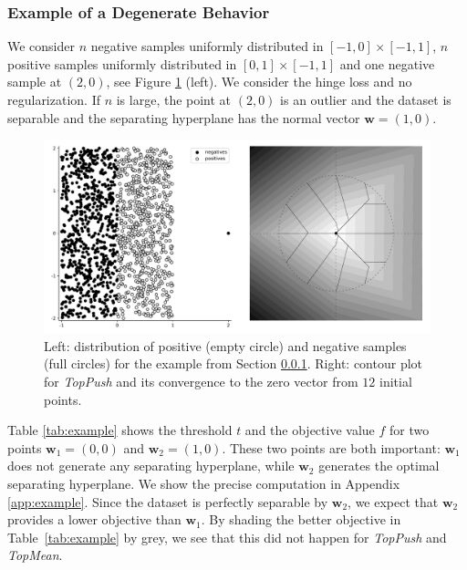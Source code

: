 \documentclass[]{interact}
\theoremstyle{plain}%
\theoremstyle{definition}
\theoremstyle{remark}
\newcommand{\toppush}{\emph{TopPush}\xspace}
\newcommand{\topmeank}{\emph{TopMean}\xspace}
\begin{document}
\subsubsection{Example of a Degenerate Behavior}\label{sec:example}

We consider $n$ negative samples uniformly distributed in $[-1,0]\times[-1,1]$, $n$ positive samples uniformly distributed in $[0,1]\times[-1,1]$ and one negative sample at $(2,0)$, see Figure \ref{fig:example} (left). We consider the hinge loss and no regularization. If $n$ is large, the point at $(2,0)$ is an outlier and the dataset is separable and the separating hyperplane has the normal vector $\bm w=(1,0)$. 

\begin{figure}[!ht]
\centering
\includegraphics[width=0.7\linewidth]{figures/toppush_convergence.pdf}
\caption{Left: distribution of positive (empty circle) and negative samples (full circles) for the example from Section \ref{sec:example}. Right: contour plot for \toppush and its convergence to the zero vector from $12$ initial points.}
\label{fig:example}
\end{figure}

Table \ref{tab:example} shows the threshold $t$ and the objective value $f$ for two points $\bm w_1=(0,0)$ and $\bm w_2=(1,0)$. These two points are both important: $\bm w_1$ does not generate any separating hyperplane, while $\bm w_2$ generates the optimal separating hyperplane. We show the precise computation in Appendix \ref{app:example}. Since the dataset is perfectly separable by $\bm w_2$, we expect that $\bm w_2$ provides a lower objective than $\bm w_1$. By shading the better objective in Table~\ref{tab:example} by grey, we see that this did not happen for \toppush and \topmeank.
\end{document}
